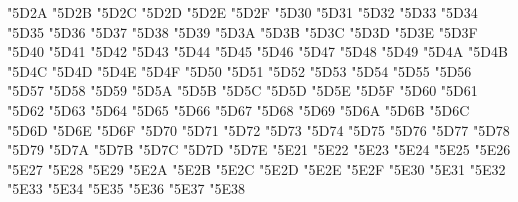 {\Uchar\jis"5D2A %
\Uchar\jis"5D2B %
\Uchar\jis"5D2C %
\Uchar\jis"5D2D %
\Uchar\jis"5D2E %
\Uchar\jis"5D2F %
\Uchar\jis"5D30 %
\Uchar\jis"5D31 %
\Uchar\jis"5D32 %
\Uchar\jis"5D33 %
\Uchar\jis"5D34 %
\Uchar\jis"5D35 %
\Uchar\jis"5D36 %
\Uchar\jis"5D37 %
\Uchar\jis"5D38 %
\Uchar\jis"5D39 %
\Uchar\jis"5D3A %
\Uchar\jis"5D3B %
\Uchar\jis"5D3C %
\Uchar\jis"5D3D %
\Uchar\jis"5D3E %
\Uchar\jis"5D3F %
\Uchar\jis"5D40 %
\Uchar\jis"5D41 %
\Uchar\jis"5D42 %
\Uchar\jis"5D43 %
\Uchar\jis"5D44 %
\Uchar\jis"5D45 %
\Uchar\jis"5D46 %
\Uchar\jis"5D47 %
\Uchar\jis"5D48 %
\Uchar\jis"5D49 %
\Uchar\jis"5D4A %
\Uchar\jis"5D4B %
\Uchar\jis"5D4C %
\Uchar\jis"5D4D %
\Uchar\jis"5D4E %
\Uchar\jis"5D4F %
\Uchar\jis"5D50 %
\Uchar\jis"5D51 %
\Uchar\jis"5D52 %
\Uchar\jis"5D53 %
\Uchar\jis"5D54 %
\Uchar\jis"5D55 %
\Uchar\jis"5D56 %
\Uchar\jis"5D57 %
\Uchar\jis"5D58 %
\Uchar\jis"5D59 %
\Uchar\jis"5D5A %
\Uchar\jis"5D5B %
\Uchar\jis"5D5C %
\Uchar\jis"5D5D %
\Uchar\jis"5D5E %
\Uchar\jis"5D5F %
\Uchar\jis"5D60 %
\Uchar\jis"5D61 %
\Uchar\jis"5D62 %
\Uchar\jis"5D63 %
\Uchar\jis"5D64 %
\Uchar\jis"5D65 %
\Uchar\jis"5D66 %
\Uchar\jis"5D67 %
\Uchar\jis"5D68 %
\Uchar\jis"5D69 %
\Uchar\jis"5D6A %
\Uchar\jis"5D6B %
\Uchar\jis"5D6C %
\Uchar\jis"5D6D %
\Uchar\jis"5D6E %
\Uchar\jis"5D6F %
\Uchar\jis"5D70 %
\Uchar\jis"5D71 %
\Uchar\jis"5D72 %
\Uchar\jis"5D73 %
\Uchar\jis"5D74 %
\Uchar\jis"5D75 %
\Uchar\jis"5D76 %
\Uchar\jis"5D77 %
\Uchar\jis"5D78 %
\Uchar\jis"5D79 %
\Uchar\jis"5D7A %
\Uchar\jis"5D7B %
\Uchar\jis"5D7C %
\Uchar\jis"5D7D %
\Uchar\jis"5D7E %
\Uchar\jis"5E21 %
\Uchar\jis"5E22 %
\Uchar\jis"5E23 %
\Uchar\jis"5E24 %
\Uchar\jis"5E25 %
\Uchar\jis"5E26 %
\Uchar\jis"5E27 %
\Uchar\jis"5E28 %
\Uchar\jis"5E29 %
\Uchar\jis"5E2A %
\Uchar\jis"5E2B %
\Uchar\jis"5E2C %
\Uchar\jis"5E2D %
\Uchar\jis"5E2E %
\Uchar\jis"5E2F %
\Uchar\jis"5E30 %
\Uchar\jis"5E31 %
\Uchar\jis"5E32 %
\Uchar\jis"5E33 %
\Uchar\jis"5E34 %
\Uchar\jis"5E35 %
\Uchar\jis"5E36 %
\Uchar\jis"5E37 %
\Uchar\jis"5E38 %
}
